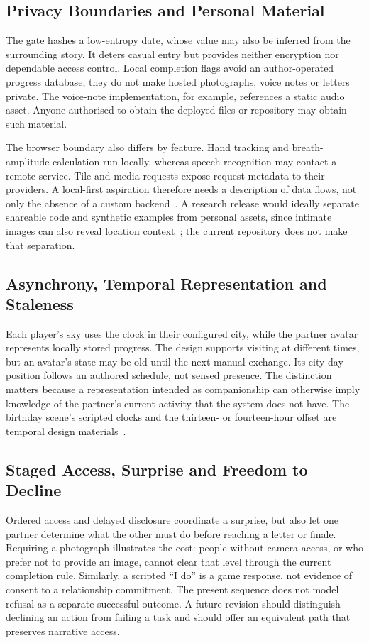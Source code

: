 \documentclass[sigconf,nonacm]{acmart}
\begin{document}
\subsection{Privacy Boundaries and Personal Material}\label{sec:privacy}
The gate hashes a low-entropy date, whose value may also be inferred from the surrounding story.
It deters casual entry but provides neither encryption nor dependable access control. Local
completion flags avoid an author-operated progress database; they do not make hosted photographs,
voice notes or letters private. The voice-note implementation, for example, references a static
audio asset. Anyone authorised to obtain the deployed files or repository may obtain such material.

The browser boundary also differs by feature. Hand tracking and breath-amplitude calculation
run locally, whereas speech recognition may contact a remote service. Tile and media requests
expose request metadata to their providers. A local-first aspiration therefore needs a description
of data flows, not only the absence of a custom backend~\cite{kleppmann2019localfirst}.
A research release would ideally separate shareable code and synthetic examples from personal
assets, since intimate images can also reveal location context~\cite{yang2024geolocator}; the
current repository does not make that separation.

\subsection{Asynchrony, Temporal Representation and Staleness}
Each player's sky uses the clock in their configured city, while the partner avatar represents
locally stored progress. The design supports visiting at different times, but an avatar's state
may be old until the next manual exchange. Its city-day position follows an authored schedule,
not sensed presence. The distinction matters because a representation intended as companionship
can otherwise imply knowledge of the partner's current activity that the system does not have.
The birthday scene's scripted clocks and the thirteen- or fourteen-hour offset are temporal
design materials~\cite{hallnas2001slow,odom2012technology}.

\subsection{Staged Access, Surprise and Freedom to Decline}
Ordered access and delayed disclosure coordinate a surprise, but also let one partner determine
what the other must do before reaching a letter or finale. Requiring a photograph illustrates the
cost: people without camera access, or who prefer not to provide an image, cannot clear that level
through the current completion rule. Similarly, a scripted ``I do'' is a game response, not evidence
of consent to a relationship commitment. The present sequence does not model refusal as a separate
successful outcome. A future revision should distinguish declining an action from failing a task
and should offer an equivalent path that preserves narrative access.
\end{document}
